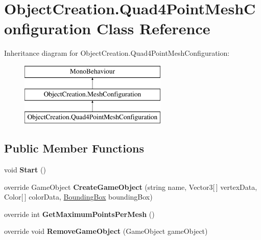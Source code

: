 \hypertarget{class_object_creation_1_1_quad4_point_mesh_configuration}{}\section{Object\+Creation.\+Quad4\+Point\+Mesh\+Configuration Class Reference}
\label{class_object_creation_1_1_quad4_point_mesh_configuration}
Inheritance diagram for Object\+Creation.\+Quad4\+Point\+Mesh\+Configuration\+:\begin{figure}[H]
\begin{center}
\leavevmode
\includegraphics[height=3.000000cm]{class_object_creation_1_1_quad4_point_mesh_configuration}
\end{center}
\end{figure}
\subsection*{Public Member Functions}
\begin{DoxyCompactItemize}
\item 
\mbox{\label{class_object_creation_1_1_quad4_point_mesh_configuration_a4dd9de3bf8bf9e370c8d6f88b95e4995}} 
void {\bfseries Start} ()
\item 
\mbox{\label{class_object_creation_1_1_quad4_point_mesh_configuration_a26c187f6c0e3ac5b718be8e0c1d7b57d}} 
override Game\+Object {\bfseries Create\+Game\+Object} (string name, Vector3\mbox{[}$\,$\mbox{]} vertex\+Data, Color\mbox{[}$\,$\mbox{]} color\+Data, \hyperlink{class_cloud_data_1_1_bounding_box}{Bounding\+Box} bounding\+Box)
\item 
\mbox{\label{class_object_creation_1_1_quad4_point_mesh_configuration_a1d54b547c414a98403352fdddef302b9}} 
override int {\bfseries Get\+Maximum\+Points\+Per\+Mesh} ()
\item 
\mbox{\label{class_object_creation_1_1_quad4_point_mesh_configuration_a5aaef0f45da279e17151df577a7b7c87}} 
override void {\bfseries Remove\+Game\+Object} (Game\+Object game\+Object)
\end{DoxyCompactItemize}

